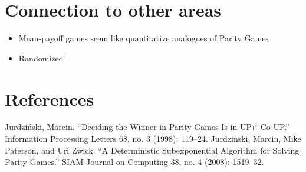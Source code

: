 \documentclass{beamer}
\begin{document}
  \section{Connection to other areas}
    \begin{itemize}
      \item Mean-payoff games seem like quantitative analogues of Parity Games
      \item Randomized
    \end{itemize}


  \section{References}

    \begin{thebibliography}{1}
       Jurdziński, Marcin. “Deciding the Winner in Parity Games Is in UP∩ Co-UP.” Information Processing Letters 68, no. 3 (1998): 119–24.
       Jurdzinski, Marcin, Mike Paterson, and Uri Zwick. “A Deterministic Subexponential Algorithm for Solving Parity Games.” SIAM Journal on Computing 38, no. 4 (2008): 1519–32.
    \end{thebibliography}
\end{document}
